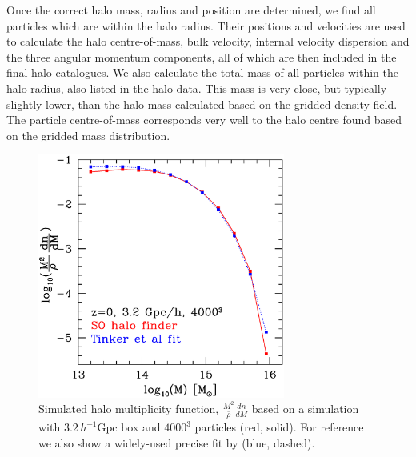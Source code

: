 Once the correct halo mass, radius and position are determined, we find all 
particles which are within the halo radius. Their positions and velocities are
used to calculate the halo centre-of-mass, bulk velocity, internal velocity 
dispersion and the three angular momentum components, all of which are then 
included in the final halo catalogues. We also calculate the total mass of
all particles within the halo radius, also listed in the halo data. This mass
is very close, but  typically slightly lower, than the halo mass calculated 
based on the gridded density field. The particle centre-of-mass corresponds 
very well to the halo centre found based on the gridded mass distribution. 


\begin{figure}%
  \begin{center}
    \includegraphics[width=3.2in]{graphs/mf_z0_Tinker.eps}
  \end{center}
  \caption{Simulated halo multiplicity function, 
    $\frac{M^2}{\bar{\rho}}\frac{dn}{dM}$ based on a
    simulation with $3.2\,h^{-1} \mbox{Gpc}$ box and $4000^3$ 
    particles (red, solid). For reference we also show a widely-used 
    precise fit by \citet{2008ApJ...688..709T} (blue, dashed). 
    \label{mf}}
\end{figure}

